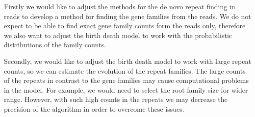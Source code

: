 Firstly we would like to adjust the methods for the de novo repeat finding in reads to develop a method for finding the gene families from the reads.
We do not expect to be able to find exact gene family counts form the reads only, therefore we also want to adjust the birth death model to work with the probabilistic distributions of the family counts.

Secondly, we would like to adjust the birth death model to work with large repeat counts, so we can estimate the evolution of the repeat families. The large counts of the repeats in contrast to the gene families may cause computational problems in the model. For example, we would need to select the root family size for wider range. However, with such high counts in the repeats we may decrease the precision of the algorithm in order to overcome these issues.
